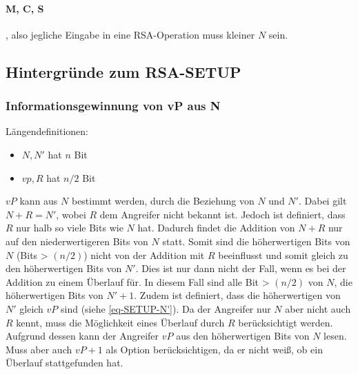             \paragraph{M, C, S}, also jegliche Eingabe in eine \ac{RSA}-Operation muss kleiner $N$ sein.

        \subsection{Hintergründe zum RSA-SETUP}
            \subsubsection{Informationsgewinnung von vP aus N} \label{sec-SETUP-vP_from_N}
            Längendefinitionen:
            \begin{itemize}
                \item $N, N'$ hat $n$ Bit
                \item $vp, R$ hat $n/2$ Bit
            \end{itemize}
            $vP$ kann aus $N$ bestimmt werden, durch die Beziehung von $N$ und $N'$. Dabei gilt $N + R = N'$, wobei $R$ dem Angreifer nicht bekannt ist. Jedoch ist definiert, dass $R$ nur halb so viele Bits wie $N$ hat. Dadurch findet die Addition von $N + R$ nur auf den niederwertigeren Bits von $N$ statt. Somit sind die höherwertigen Bits von $N$ (Bits > $(n/2)$) nicht von der Addition mit $R$ beeinflusst und somit gleich zu den höherwertigen Bits von $N'$. Dies ist nur dann nicht der Fall, wenn es bei der Addition zu einem Überlauf für. In diesem Fall sind alle Bit > $(n/2)$ von $N$, die höherwertigen Bits von $N' + 1$.
            Zudem ist definiert, dass die höherwertigen von $N'$ gleich $vP$ sind (siehe \ref{eq-SETUP-N'}).
            Da der Angreifer nur $N$ aber nicht auch $R$ kennt, muss die Möglichkeit eines Überlauf durch $R$ berücksichtigt werden. 
            Aufgrund dessen kann der Angreifer $vP$ aus den höherwertigen Bits von $N$ lesen. Muss aber auch $vP + 1$ als Option berücksichtigen, da er nicht weiß, ob ein Überlauf stattgefunden hat.               
 
